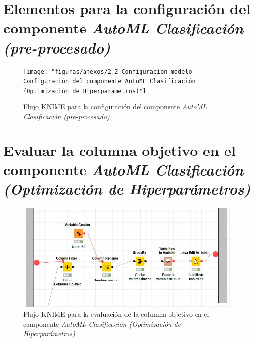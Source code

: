 \appendix

\clearpage{\renewcommand{\appendixname}{Anexos}}
\addappheadtotoc

\chapter{Elementos para la configuración del componente \textit{AutoML Clasificación (pre-procesado)}}\label{aped:1}

\begin{figure}[H]
	\centering
	\texttt{[image: "figuras/anexos/2.2 Configuracion modelo-----Configuración del componente AutoML Clasificación (Optimización de Hiperparámetros)"]}
	\caption{Flujo KNIME para la configuración del componente \textit{AutoML Clasificación (pre-procesado)}}
	\label{anex:config-hpo-comp}
\end{figure}

\chapter{Evaluar la columna objetivo en el componente\textit{ AutoML Clasificación (Optimización de Hiperparámetros)}}\label{aped:2}

\begin{figure}[H]
	\centering
	\includegraphics[width=\textwidth]{"figuras/anexos/2.2.2 Evaluar columna objetivo"}
	\caption{Flujo KNIME para la evaluación de la columna objetivo en el componente\textit{ AutoML Clasificación (Optimización de Hiperparámetros)}}
	\label{anex:evaluar-columna-obj}
\end{figure}
	

